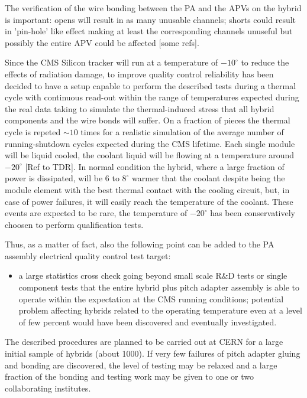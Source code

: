 The verification of the wire bonding between the PA and the APVs on
the hybrid is important: opens will result in as many unusable 
channels; shorts could result in 'pin-hole' like effect making at
least the corresponding channels unuseful but possibly the entire APV 
could be affected [some refs]. 

Since the CMS Silicon tracker will run at a
temperature of $-10^\circ$ to reduce the effects of radiation
damage, to improve quality control reliability has been decided to
have a setup capable to perform the described tests during a thermal
cycle with continuous read-out within the range of temperatures
expected during the real data taking to simulate the thermal-induced
stress that all hybrid components and the wire bonds will suffer. On a
fraction of pieces the thermal cycle is repeted $\sim10$ times for a
realistic simulation of the average number of running-shutdown cycles
expected during the CMS lifetime. Each single module will be liquid cooled,
the coolant liquid will be flowing at a temperature around $-20^\circ$
[Ref to TDR]. In normal condition the hybrid, where a large fraction
of power is dissipated, will be $6$ to $8^\circ$ warmer that the
coolant despite being the module element with the best thermal contact
with the cooling circuit, but, in case of power failures, it will
easily reach the temperature of the coolant. These events are
expected to be rare, the temperature of $-20^\circ$ has been
conservatively choosen to perform qualification tests.

Thus, as a matter of fact, also the following point can be added to the PA
assembly electrical quality control test target: 
\begin{itemize}
\item a large statistics cross check going beyond small scale R\&D
  tests or single component tests that the entire hybrid plus pitch
  adapter assembly is able to operate within the expectation at the
  CMS running conditions; potential problem affecting hybrids related
  to the operating temperature even at a level of few percent would
  have been discovered and eventually investigated.
\end{itemize}

The described procedures are planned to be carried out at
CERN for a large initial sample of hybrids (about 1000). If very few
failures of pitch adapter gluing and bonding are discovered, the level
of testing may be relaxed and a large fraction of the bonding and
testing work may be given to one or two collaborating institutes.

